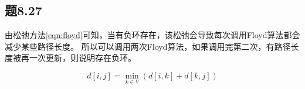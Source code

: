 \documentclass[a4paper,twoside]{article}
\begin{document}
\begin{spacing}{1.2}
\section{题8.27}

由松弛方法\eqref{eqn:floyd}可知，当有负环存在，该松弛会导致每次调用Floyd算法都会减少某些路径长度。
所以可以调用两次Floyd算法，如果调用完第二次，有路径长度被再一次更新，则说明存在负环。

\begin{equation}
	\label{eqn:floyd}
	d[i,j]=\min_{k\in V}(d[i,k]+d[k,j])
\end{equation}


\end{spacing}
\end{document}
